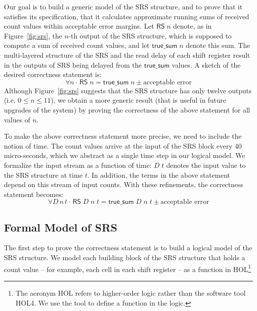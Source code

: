 \documentclass{llncs}
\begin{document}
Our goal is to build a generic model of the SRS structure, and to prove that it satisfies its specification, that it calculates approximate running sums of received count values within acceptable error margins.
Let $\mathsf{RS}\;n$ denote, as in Figure~\ref{fig:srs}, the $n$-th output of the SRS structure, which is supposed to compute a sum of received count values, and let $\mathsf{true\_sum}\;n$ denote this sum.
The multi-layered structure of the SRS and the read delay of each shift register result in the outputs of SRS being delayed from the $\mathsf{true\_sum}$ values.
A sketch of the desired correctness statement is: \[\forall{n} \cdot \, \mathsf{RS}\;n= \mathsf{true\_sum}\; n \pm\text{acceptable error}\]
Although Figure~\ref{fig:srs} suggests that the SRS structure has only twelve outputs  (i.e. $0\leq{n}\leq11$), we obtain a more generic result (that is useful in future upgrades of the system) by proving the correctness of the above statement for all values of $n$.

To make the above correctness statement more precise, we need to include the notion of time.
The count values arrive at the input of the SRS block every 40 micro-seconds, which we abstract as a single time step in our logical model.
We formalize the input stream as a function of time: $D\;t$ denotes the input value to the SRS structure at time $t$.
In addition, the terms in the above statement depend on this stream of input counts.
With these refinements, the correctness statement becomes: \[\forall{D\,n\,t} \cdot \,\mathsf{RS}\;D\;n\;t = \mathsf{true\_sum}\;D\;n\;t\pm\text{acceptable error}\]

\subsection{Formal Model of SRS}
The first step to prove the correctness statement is to build a logical model of the SRS structure.
We model each building block of the SRS structure that holds a count value -- for example, each cell in each shift register -- as a function in HOL\footnote{The acronym HOL refers to higher-order logic rather than the software tool HOL4.
We use the tool to define a function in the logic.}
\end{document}
